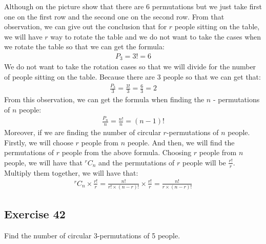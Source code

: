\documentclass{article}
\theoremstyle{mytheoremstyle}
\theoremstyle{mytheoremstyle}
\theoremstyle{myproblemstyle}
\begin{document}
\begin{center}
        \space
    \end{center}
    Although on the picture show that there are 6 permutations but we just take first one on the first row and the
    second one on the second row. From that observation, we can give out the conclusion that for \(r\) people sitting on the
    table, we will have \(r\) way to rotate the table and we do not want to take the cases when we rotate the table so that
    we can get the formula:
    \begin{align*}
        P_3 = 3! = 6
    \end{align*}
    We do not want to take the rotation cases so that we will divide for the number of people sitting on the table. Because 
    there are 3 people so that we can get that:
    \begin{align*}
        \frac{P_3}{3} = \frac{3!}{3} = \frac{6}{3} = 2
    \end{align*}
    From this observation, we can get the formula when finding the \(n\) - permutations of \(n\) people:
    \begin{align*}
        \frac{P_n}{n} = \frac{n!}{n} = (n-1)!
    \end{align*}
    Moreover, if we are finding the number of circular \(r\)-permutations of \(n\) people. Firstly, we will choose \(r\) people
    from \(n\) people. And then, we will find the permutations of \(r\) people from the above formula. Choosing \(r\) people
    from \(n\) people, we will have that \(^rC_n\) and the permutations of \(r\) people will be \(\frac{r!}{r}\). Multiply them together,
    we will have that:
    \begin{align*}
        ^rC_n \times \frac{r!}{r} = \frac{n!}{r! \times (n - r)!} \times \frac{r!}{r} = \frac{n!}{r \times (n - r)!}
    \end{align*}
    \subsection*{Exercise 42}
    Find the number of circular 3-permutations of 5 people.
\end{document}
